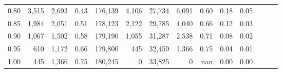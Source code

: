 \begin{tabular}{rrrrrrrrrrrrrr}
0.80 &   3,515 &  2,693 &  0.43 &  176,139 &    4,106 &  27,734 &   6,091 &  0.60 &  0.18 &      0.05 \\
0.85 &   1,984 &  2,051 &  0.51 &  178,123 &    2,122 &  29,785 &   4,040 &  0.66 &  0.12 &      0.03 \\
0.90 &   1,067 &  1,502 &  0.58 &  179,190 &    1,055 &  31,287 &   2,538 &  0.71 &  0.08 &      0.02 \\
0.95 &     610 &  1,172 &  0.66 &  179,800 &      445 &  32,459 &   1,366 &  0.75 &  0.04 &      0.01 \\
1.00 &     445 &  1,366 &  0.75 &  180,245 &        0 &  33,825 &       0 &   nan &  0.00 &      0.00 \\
\bottomrule
\end{tabular}
